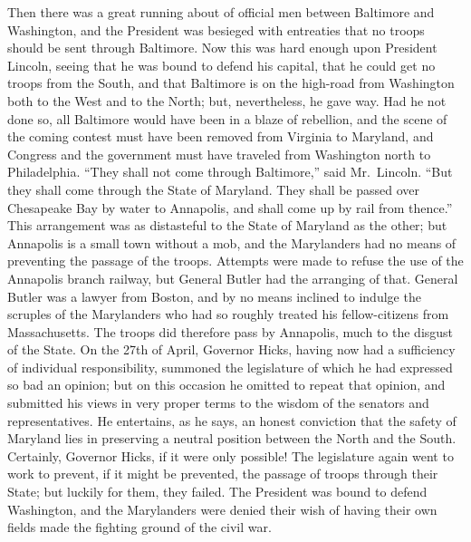 Then there was a great running about of official men between
Baltimore and Washington, and the President was besieged with
entreaties that no troops should be sent through Baltimore.  Now
this was hard enough upon President Lincoln, seeing that he was
bound to defend his capital, that he could get no troops from the
South, and that Baltimore is on the high-road from Washington both
to the West and to the North; but, nevertheless, he gave way.  Had
he not done so, all Baltimore would have been in a blaze of
rebellion, and the scene of the coming contest must have been
removed from Virginia to Maryland, and Congress and the government
must have traveled from Washington north to Philadelphia.  ``They
shall not come through Baltimore,'' said Mr.\ Lincoln.  ``But they
shall come through the State of Maryland.  They shall be passed
over Chesapeake Bay by water to Annapolis, and shall come up by
rail from thence.''  This arrangement was as distasteful to the
State of Maryland as the other; but Annapolis is a small town
without a mob, and the Marylanders had no means of preventing the
passage of the troops.  Attempts were made to refuse the use of the
Annapolis branch railway, but General Butler had the arranging of
that.  General Butler was a lawyer from Boston, and by no means
inclined to indulge the scruples of the Marylanders who had so
roughly treated his fellow-citizens from Massachusetts.  The troops
did therefore pass by Annapolis, much to the disgust of the State.
On the 27th of April, Governor Hicks, having now had a sufficiency
of individual responsibility, summoned the legislature of which he
had expressed so bad an opinion; but on this occasion he omitted to
repeat that opinion, and submitted his views in very proper terms
to the wisdom of the senators and representatives.  He entertains,
as he says, an honest conviction that the safety of Maryland lies
in preserving a neutral position between the North and the South.
Certainly, Governor Hicks, if it were only possible!  The
legislature again went to work to prevent, if it might be
prevented, the passage of troops through their State; but luckily
for them, they failed.  The President was bound to defend
Washington, and the Marylanders were denied their wish of having
their own fields made the fighting ground of the civil war.

